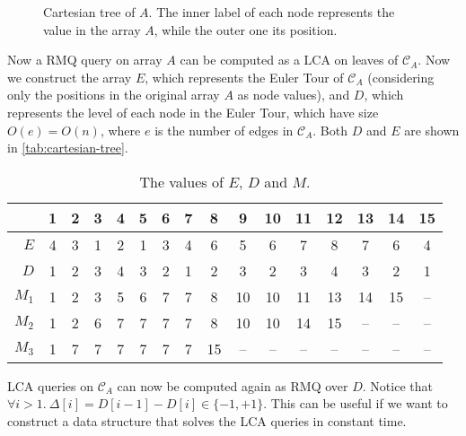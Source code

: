 \begin{enumerate}
\begin{figure}[t]
    \caption{Cartesian tree of $A$. The inner label of each node represents the
    value in the array $A$, while the outer one its position.}

    \label{fig:cartesian-tree}
  \end{figure}
  Now a RMQ query on array $A$ can be computed as a LCA on leaves of
  $\mathcal{C}_A$. Now we construct the array $E$, which represents the Euler
  Tour of $\mathcal{C}_A$ (considering only the positions in the original array
  $A$ as node values), and $D$, which represents the level of each node in the
  Euler Tour, which have size $O(e) = O(n)$, where $e$ is the number of edges in
  $\mathcal{C}_A$. Both $D$ and $E$ are shown in \autoref{tab:cartesian-tree}.
  \begin{table}
    \centering
    \begin{tabular}{|r||c|c|c|c|c|c|c|c|c|c|c|c|c|c|c|}
      \multicolumn{1}{c}{} & \multicolumn{1}{c}{\tiny 1} &
      \multicolumn{1}{c}{\tiny 2} & \multicolumn{1}{c}{\tiny 3} &
      \multicolumn{1}{c}{\tiny 4} & \multicolumn{1}{c}{\tiny 5} &
      \multicolumn{1}{c}{\tiny 6} & \multicolumn{1}{c}{\tiny 7} &
      \multicolumn{1}{c}{\tiny 8} & \multicolumn{1}{c}{\tiny 9} &
      \multicolumn{1}{c}{\tiny 10} & \multicolumn{1}{c}{\tiny 11} &
      \multicolumn{1}{c}{\tiny 12} & \multicolumn{1}{c}{\tiny 13} &
      \multicolumn{1}{c}{\tiny 14} &
      \multicolumn{1}{c}{\tiny 15} \\\hline
      $E$ & 4 & 3 & 1 & 2 & 1 & 3 & 4 & 6 & 5 & 6 & 7 & 8 & 7 & 6 & 4 \\\hline
      $D$ & 1 & 2 & 3 & 4 & 3 & 2 & 1 & 2 & 3 & 2 & 3 & 4 & 3 & 2 & 1 \\\hline\hline
      $M_1$ & 1 & 2 & 3 & 5 & 6 & 7 & 7 & 8 & 10 & 10 & 11 & 13 & 14 & 15 & -- \\
      $M_2$ & 1 & 2 & 6 & 7 & 7 & 7 & 7 & 8 & 10 & 10 & 14 & 15 & -- & -- & -- \\
      $M_3$ & 1 & 7 & 7 & 7 & 7 & 7 & 7 & 15 & -- & -- & -- & -- & -- & -- & -- \\\hline
    \end{tabular}

    \caption{The values of $E$, $D$ and $M$.}
    \label{tab:cartesian-tree}

  \end{table}
  LCA queries on $\mathcal{C}_A$ can now be computed again as RMQ over $D$.
  Notice that $\forall i > 1.\ \Delta[i] = D[i - 1] - D[i] \in \{-1, +1\}$. This
  can be useful if we want to construct a data structure that solves the LCA
  queries in constant time.


\end{enumerate}
